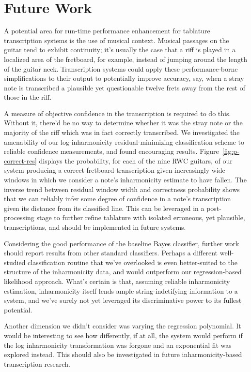 \documentclass[12pt]{cmuthesis}
\begin{document}
\section{Future Work}
A potential area for run-time performance enhancement for tablature transcription systems is the use of musical context. Musical passages on the guitar tend to exhibit continuity; it's usually the case that a riff is played in a localized area of the fretboard, for example, instead of jumping around the length of the guitar neck. Transcription systems could apply these performance-borne simplifications to their output to potentially improve accuracy, say, when a stray note is transcribed a plausible yet questionable twelve frets away from the rest of those in the riff.

A measure of objective confidence in the transcription is required to do this. Without it, there'd be no way to determine whether it was the stray note or the majority of the riff which was in fact correctly transcribed. We investigated the amenability of our log-inharmonicity residual-minimizing classification scheme to reliable confidence measurements, and found encouraging results. Figure~\ref{fig:p-correct-res} displays the probability, for each of the nine RWC guitars, of our system producing a correct fretboard transcription given increasingly wide windows in which we consider a note's inharmonicity estimate to have fallen. The inverse trend between residual window width and correctness probability shows that we can reliably infer some degree of confidence in a note's transcription given its distance from its classified line. This can be leveraged in a post-processing stage to further refine tablature with isolated erroneous, yet plausible, transcriptions, and should be implemented in future systems.

Considering the good performance of the baseline Bayes classifier, further work should report results from other standard classifiers. Perhaps a different well-studied classification routine that we've overlooked is even better-suited to the structure of the inharmonicity data, and would outperform our regression-based likelihood approach. What's certain is that, assuming reliable inharmonicity estimation, inharmonicity itself lends ample string-indetifying information to a system, and we've surely not yet leveraged its discriminative power to its fullest potential.

Another dimension we didn't consider was varying the regression polynomial. It would be interesting to see how differently, if at all, the system would perform if the log inharmonicity transformation was forgone and an exponential fit was explored instead. This should also be investigated in future inharmonicity-based transcription research.
\end{document}

